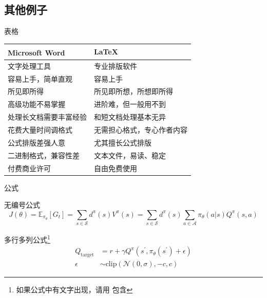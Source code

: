 \documentclass[no-math]{ctexbeamer}
\begin{document}
\subsection{其他例子}

\begin{frame}{表格}
	\begin{table}[h]
		\centering
		\begin{tabular}{ll}
			\toprule
			Microsoft\textsuperscript{\textregistered}  Word & \LaTeX \\
			\midrule
			文字处理工具 & 专业排版软件 \\
			容易上手，简单直观 & 容易上手 \\
			所见即所得 & 所见即所想，所想即所得 \\
			高级功能不易掌握 & 进阶难，但一般用不到 \\
			处理长文档需要丰富经验 & 和短文档处理基本无异 \\
			花费大量时间调格式 & 无需担心格式，专心作者内容 \\
			公式排版差强人意 & 尤其擅长公式排版 \\
			二进制格式，兼容性差 & 文本文件，易读、稳定 \\
			付费商业许可 & 自由免费使用 \\
			\bottomrule
		\end{tabular}
	\end{table}
\end{frame}

\begin{frame}{公式}
	\begin{exampleblock}{无编号公式} %
		\begin{equation*}
			J(\theta) = \mathbb{E}_{\pi_\theta}[G_t] = \sum_{s\in\mathcal{S}} d^\pi (s)V^\pi(s)=\sum_{s\in\mathcal{S}} d^\pi(s)\sum_{a\in\mathcal{A}}\pi_\theta(a|s)Q^\pi(s,a)
		\end{equation*}
	\end{exampleblock}
	
	\begin{exampleblock}{多行多列公式\footnote{如果公式中有文字出现，请用  包含}}
		\begin{align}
			Q_\text{target}&=r+\gamma Q^\pi(s^\prime, \pi_\theta(s^\prime)+\epsilon)\\
			\epsilon&\sim\text{clip}(\mathcal{N}(0, \sigma), -c, c)\nonumber
		\end{align}
	\end{exampleblock}
\end{frame}
\end{document}

